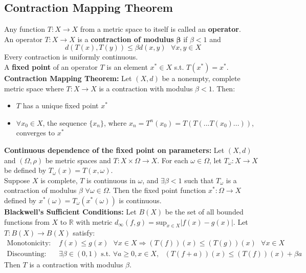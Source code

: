 \documentclass{article}
\newcommand{\R}{\mathbb{R}}
\begin{document}
\subsection{Contraction Mapping Theorem}
Any function $T:X\rightarrow X$ from a metric space to itself is called an \textbf{operator}.
\smallskip \\
An operator $T:X\rightarrow X$ is a \textbf{contraction of modulus} $\mathbf{\beta}$ if $\beta<1$ and
\[
	d(T(x),T(y))\leq \beta d(x,y)\text{ }\forall x,y\in X 
\]
Every contraction is uniformly continuous.
\medskip \\
A \textbf{fixed point} of an operator $T$ is an element $x^*\in X$ s.t. $T(x^*)=x^*$.
\medskip \\
\textbf{Contraction Mapping Theorem:} Let $(X,d)$ be a nonempty, complete metric space where $T:X\rightarrow X$ is a contraction with modulus $\beta<1$. Then:
\begin{itemize}
	\item $T$ has a unique fixed point $x^*$ 
	\item $\forall x_0\in X$, the sequence $\{x_n\}$, where $x_n=T^n(x_0)=T(T(...T(x_0)...))$, converges to $x^*$
\end{itemize}
\medskip
\textbf{Continuous dependence of the fixed point on parameters:} Let $(X,d)$ and $(\Omega,\rho)$ be metric spaces and $T:X\times\Omega\rightarrow X$. For each $\omega\in\Omega$, let $T_\omega:X\rightarrow X$ be defined by $T_\omega(x)=T(x,\omega)$.
\smallskip \\
Suppose $X$ is complete, $T$ is continuous in $\omega$, and $\exists\beta<1$ such that $T_\omega$ is a contraction of modulus $\beta$ $\forall\omega\in\Omega$. Then the fixed point function $x^*:\Omega\rightarrow X$ defined by $x^*(\omega)=T_\omega(x^*(\omega))$ is continuous.
\bigskip \\
\textbf{Blackwell's Sufficient Conditions:} Let $B(X)$ be the set of all bounded functions from $X$ to $\R$ with metric $d_\infty(f,g)=\text{sup}_{x\in X}|f(x)-g(x)|$. Let $T:B(X)\rightarrow B(X)$ satisfy:
\begin{align*}
	\text{Monotonicity: } &f(x)\leq g(x)\text{ }\forall x\in X \Rightarrow (T(f))(x)\leq(T(g))(x)\text{ }\forall x\in X      \\
	\text{Discounting: } &\exists\beta\in(0,1)\text{ s.t. }\forall a\geq 0,x\in X,\text{ }(T(f+a))(x)\leq(T(f))(x)+\beta a 
\end{align*}
Then $T$ is a contraction with modulus $\beta$.


\end{document}
